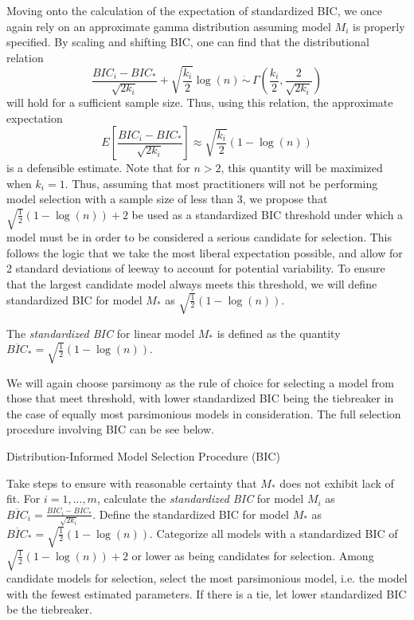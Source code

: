 		Moving onto the calculation of the expectation of standardized BIC, we once again rely on an approximate gamma distribution assuming model $M_i$ is properly specified.
		By scaling and shifting BIC, one can find that the distributional relation
		\begin{equation}
			\frac{BIC_i - BIC_*}{\sqrt{2k_i}} + \sqrt{\frac{k_i}{2}} \log(n) \, \dot\sim \, \Gamma \left( \frac{k_i}{2}, \frac{2}{\sqrt{2k_i}} \right)
		\end{equation}
		will hold for a sufficient sample size. Thus, using this relation, the approximate expectation
		\begin{equation}
			E \left[ \frac{BIC_i - BIC_*}{\sqrt{2k_i}} \right] \approx \sqrt{\frac{k_i}{2}} (1-\log(n))
		\end{equation}
		is a defensible estimate. Note that for $n > 2$, this quantity will be maximized when $k_i = 1$. Thus, assuming that most practitioners will not be performing model
		selection with a sample size of less than 3, we propose that $\sqrt{\frac{1}{2}} (1-\log(n)) + 2$ be used as a standardized BIC threshold under which a model must be
		in order to be considered a serious candidate for selection. This follows the logic that we take the most liberal expectation possible, and allow for 2 standard
		deviations of leeway to account for potential variability. To ensure that the largest candidate model always meets this threshold, we will define standardized BIC
		for model $M_*$ as $\sqrt{\frac{1}{2}} (1-\log(n))$.
		\begin{definition}
			The \textit{standardized BIC} for linear model $M_*$ is defined as the quantity $\overline{BIC}_* = \sqrt{\frac{1}{2}} (1-\log(n))$.
		\end{definition}
		
		We will again choose parsimony as the rule of choice for selecting a model from those that meet threshold, with lower standardized BIC being the tiebreaker in the
		case of equally most parsimonious models in consideration. The full selection procedure involving BIC can be see below.
		\begin{algorithm}[H]
			\caption{Distribution-Informed Model Selection Procedure (BIC)}
			\begin{algorithmic}[1]
			  \State Take steps to ensure with reasonable certainty that $M_*$ does not exhibit lack of fit.
			  \State For $i = 1,...,m$, calculate the \textit{standardized BIC} for model $M_i$ as 
			  $\overline{BIC}_i = \frac{BIC_i - BIC_*}{\sqrt{2k_i}}$. Define the standardized BIC for model
			  $M_*$ as $\overline{BIC}_* = \sqrt{\frac{1}{2}} (1-\log(n))$.
			  \State Categorize all models with a standardized BIC of $\sqrt{\frac{1}{2}} (1-\log(n)) + 2$ or lower as
			  being candidates for selection.
			  \State Among candidate models for selection, select the most parsimonious model, i.e. the model
			  with the fewest estimated parameters. If there is a tie, let lower standardized BIC be the
			  tiebreaker.
			\end{algorithmic}
		\end{algorithm}

